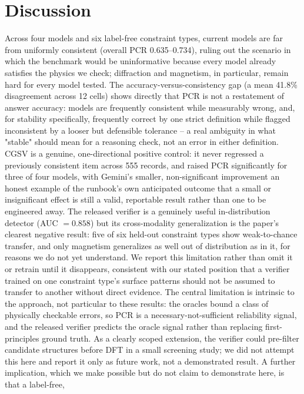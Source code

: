 \documentclass[pdflatex,sn-nature]{sn-jnl}
\begin{document}
\section*{Discussion}
Across four models and six label-free constraint types, current models are far from
uniformly consistent (overall PCR 0.635--0.734), ruling out the scenario in which the
benchmark would be uninformative because every model already satisfies the physics we
check; diffraction and magnetism, in particular, remain hard for every model tested.
The accuracy-versus-consistency gap (a mean 41.8\% disagreement across 12 cells) shows
directly that PCR is not a restatement of answer accuracy: models are frequently
consistent while measurably wrong, and, for stability specifically, frequently correct
by one strict definition while flagged inconsistent by a looser but defensible
tolerance -- a real ambiguity in what "stable" should mean for a reasoning check,
not an error in either definition. CGSV is a genuine, one-directional positive
control: it never regressed a previously consistent item across 555 records, and
raised PCR significantly for three of four models, with Gemini's smaller, non-significant
improvement an honest example of the runbook's own anticipated outcome that a
small or insignificant effect is still a valid, reportable result rather than one to
be engineered away. The released verifier is a genuinely useful in-distribution
detector (AUC $=0.858$) but its cross-modality generalization is the paper's clearest
negative result: five of six held-out constraint types show weak-to-chance transfer,
and only magnetism generalizes as well out of distribution as in it, for reasons we
do not yet understand. We report this limitation rather than omit it or retrain until
it disappears, consistent with our stated position that a verifier trained on one
constraint type's surface patterns should not be assumed to transfer to another
without direct evidence. The central limitation is intrinsic to the approach, not
particular to these results: the oracles bound a class of physically checkable
errors, so PCR is a necessary-not-sufficient reliability signal, and the released
verifier predicts the oracle signal rather than replacing first-principles ground
truth. As a clearly scoped extension, the verifier could pre-filter candidate
structures before DFT in a small screening study; we did not attempt this here and
report it only as future work, not a demonstrated result. A further implication,
which we make possible but do not claim to demonstrate here, is that a label-free,
\end{document}

